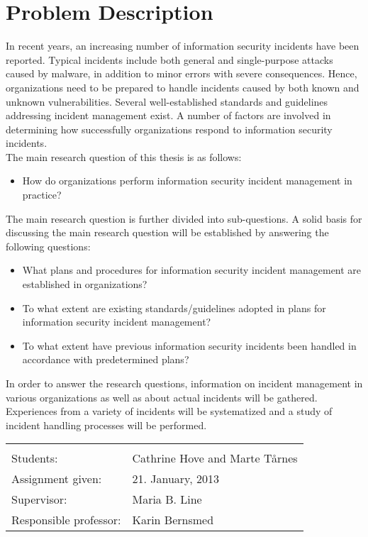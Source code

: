 \documentclass[b5paper, twoside, openright, 11pt]{report}
\begin{document}
\chapter*{Problem Description}
\vspace{-0.2cm}
In recent years, an increasing number of information security incidents have been reported. Typical incidents include both general and single-purpose attacks caused by malware, in addition to minor errors with severe consequences. Hence, organizations need to be prepared to handle incidents caused by both known and unknown vulnerabilities. Several well-established standards and guidelines addressing incident management exist. A number of factors are involved in determining how successfully organizations respond to information security incidents. \\

The main research question of this thesis is as follows: 
\begin{itemize}
\item How do organizations perform information security incident management in practice?
\end{itemize}

The main research question is further divided into sub-questions. A solid basis for discussing the main research question will be established by answering the following questions:\\

\begin{itemize}\itemsep-0.1cm
\item What plans and procedures for information security incident management are established in organizations?
\item To what extent are existing standards/guidelines adopted in plans for information security incident management?
\item To what extent have previous information security incidents been handled in accordance with predetermined plans? 
\end{itemize}

In order to answer the research questions, information on incident management in various organizations as well as about actual incidents will be gathered. Experiences from a variety of incidents will be systematized and a study of incident handling processes will be performed.


\begin{tabular}{@{}p{4cm}l}
\vspace{0.1cm} & \vspace{0.1cm} \\
Students:		& Cathrine Hove and Marte T\aa rnes \\
Assignment given: & 21. January, 2013 \\
Supervisor:		& Maria B. Line \\
Responsible professor: 	& Karin Bernsmed 
\end{tabular}
\end{document}

